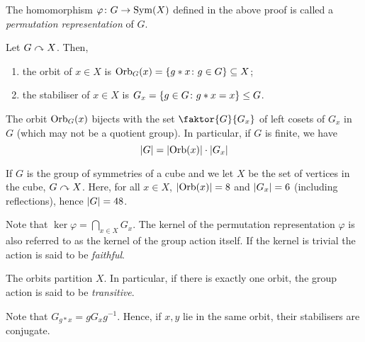 \begin{definition}
	The homomorphism \( \varphi \colon G \to \operatorname{Sym}(X) \) defined in the above proof is called a \textit{permutation representation} of \( G \).
\end{definition}
\begin{definition}
	Let \( G \curvearrowright X \).
	Then,
	\begin{enumerate}
		\item the orbit of \( x \in X \) is \( \operatorname{Orb}_G(x) = \qty{g \ast x \colon g \in G} \subseteq X \);
		\item the stabiliser of \( x \in X \) is \( G_x = \qty{g \in G \colon g \ast x = x} \leq G \).
	\end{enumerate}
\end{definition}
\begin{theorem}
	The orbit \( \operatorname{Orb}_G(x) \) bijects with the set \( \faktor{G}{G_x} \) of left cosets of \( G_x \) in \( G \) (which may not be a quotient group).
	In particular, if \( G \) is finite, we have
	\[
		\abs{G} = \abs{\operatorname{Orb}(x)} \cdot \abs{G_x}
	\]
\end{theorem}
\begin{example}
	If \( G \) is the group of symmetries of a cube and we let \( X \) be the set of vertices in the cube, \( G \curvearrowright X \).
	Here, for all \( x \in X \), \( \abs{\operatorname{Orb}(x)} = 8 \) and \( \abs{G_x} = 6 \) (including reflections), hence \( \abs{G} = 48 \).
\end{example}
\begin{remark}
	Note that \( \ker \varphi = \bigcap_{x \in X} G_x \).
	The kernel of the permutation representation \( \varphi \) is also referred to as the kernel of the group action itself.
	If the kernel is trivial the action is said to be \textit{faithful}.

	The orbits partition \( X \).
	In particular, if there is exactly one orbit, the group action is said to be \textit{transitive}.

	Note that \( G_{g \ast x} = g G_x g^{-1} \).
	Hence, if \( x, y \) lie in the same orbit, their stabilisers are conjugate.
\end{remark}

